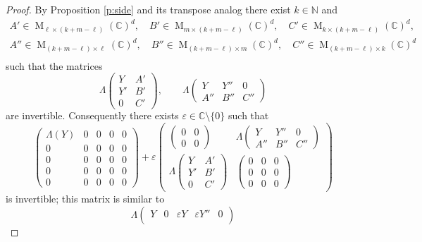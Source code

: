 \documentclass[12pt,a4paper]{amsart}
\DeclareMathOperator{\opm}{M}
\newcommand{\ve}{\varepsilon}
\newcommand{\N}{\mathbb{N}}
\newcommand{\C}{\mathbb{C}}
\newcommand*{\mat}[1]{\opm_{#1}(\C)}
\theoremstyle{definition}
\theoremstyle{remark}
\numberwithin{equation}{section}
\begin{document}
\begin{proof}
By Proposition \ref{p:side} and its transpose analog there exist $k\in\N$ and
\begin{align*}
A'\in \mat{\ell\times (k+m-\ell)}^d,\quad 
B'\in \mat{m\times (k+m-\ell)}^d,\quad
C'\in \mat{k\times (k+m-\ell)}^d, \\
A''\in \mat{(k+m-\ell)\times \ell}^d,\quad 
B''\in \mat{(k+m-\ell)\times m}^d,\quad
C''\in \mat{(k+m-\ell)\times k}^d \\
\end{align*}
such that the matrices
$$\Lambda
\begin{pmatrix}
Y & A' \\ Y' & B' \\ 0 & C'
\end{pmatrix}
,\qquad
\Lambda
\begin{pmatrix}
Y & Y'' &0 \\ A'' & B'' & C''
\end{pmatrix}
$$
are invertible. Consequently there exists $\ve\in\C\setminus\{0\}$ such that
$$\begin{pmatrix}
\Lambda(Y) & 0 & 0 &0 & 0 \\
0 & 0 & 0 &0 & 0 \\
0 & 0 & 0 &0 & 0 \\
0 & 0 & 0 &0 & 0 \\
0 & 0 & 0 &0 & 0
\end{pmatrix}
+\ve\begin{pmatrix}
\begin{pmatrix}0 & 0 \\ 0 &0 \end{pmatrix} &
\Lambda
\begin{pmatrix}
Y & Y'' &0 \\ A'' & B'' & C''
\end{pmatrix}
\\
\Lambda
\begin{pmatrix}
Y & A' \\ Y' & B' \\ 0 & C'
\end{pmatrix}
&
\begin{pmatrix}0 & 0 & 0\\ 0 &0 &0\\ 0 &0 &0\end{pmatrix}
\end{pmatrix}$$
is invertible; this matrix is similar to
\begin{equation}\label{e:eps}
\Lambda
 \begin{pmatrix}
 Y & 0 & \ve Y & \ve Y'' &0 \\

\end{pmatrix}
\end{equation}
\end{proof}
\end{document}
